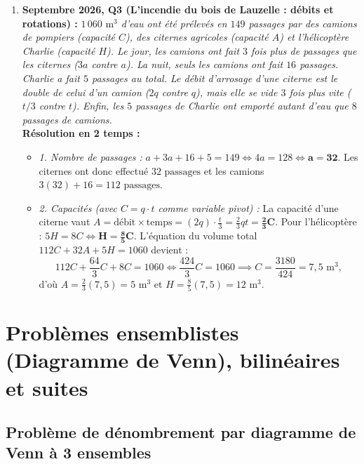\begin{exemple}
\begin{enumerate}
    \item \textbf{Septembre 2026, Q3 (L'incendie du bois de Lauzelle : débits et rotations) :}
    \emph{$1\,060\text{ m}^3$ d'eau ont été prélevés en $149$ passages par des camions de pompiers (capacité $C$), des citernes agricoles (capacité $A$) et l'hélicoptère Charlie (capacité $H$). Le jour, les camions ont fait $3$ fois plus de passages que les citernes ($3a$ contre $a$). La nuit, seuls les camions ont fait $16$ passages. Charlie a fait $5$ passages au total. Le débit d'arrosage d'une citerne est le double de celui d'un camion ($2q$ contre $q$), mais elle se vide $3$ fois plus vite ($t/3$ contre $t$). Enfin, les $5$ passages de Charlie ont emporté autant d'eau que $8$ passages de camions.}\\
    \textbf{Résolution en 2 temps :}
    \begin{itemize}
        \item \emph{1. Nombre de passages :} $a + 3a + 16 + 5 = 149 \iff 4a = 128 \iff \mathbf{a = 32}$. Les citernes ont donc effectué $\boxed{32\text{ passages}}$ et les camions $3(32) + 16 = \boxed{112\text{ passages}}$.
        \item \emph{2. Capacités (avec $C = q\cdot t$ comme variable pivot) :}
        La capacité d'une citerne vaut $A = \text{débit} \times \text{temps} = (2q)\cdot\frac{t}{3} = \frac{2}{3}qt = \mathbf{\frac{2}{3}C}$.
        Pour l'hélicoptère : $5H = 8C \iff \mathbf{H = \frac{8}{5}C}$.
        L'équation du volume total $112C + 32A + 5H = 1060$ devient :
        \[
            112C + \frac{64}{3}C + 8C = 1060 \iff \frac{424}{3}C = 1060 \implies C = \frac{3180}{424} = \boxed{7,5\text{ m}^3},
        \]
        d'où $A = \frac{2}{3}(7,5) = \boxed{5\text{ m}^3}$ et $H = \frac{8}{5}(7,5) = \boxed{12\text{ m}^3}$.
    \end{itemize}
\end{enumerate}
\end{exemple}

\section{Problèmes ensemblistes (Diagramme de Venn), bilinéaires et suites}

\subsection{Problème de dénombrement par diagramme de Venn à 3 ensembles}


